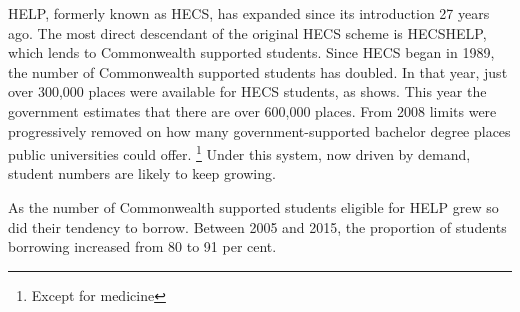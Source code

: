 \documentclass[embargoed]{grattan}
\begin{document}
\gls{HELP}, formerly known as \gls{HECS}, has expanded since its introduction 27 years ago.
The most direct descendant of the original \gls{HECS} scheme is \gls{HECSHELP}, which lends to Commonwealth supported students.
Since \gls{HECS} began in 1989, the number of Commonwealth supported students has doubled.
In that year, just over 300,000 places were available for \gls{HECS} students, as  shows.\afterpage{\cleardoublepage} %
This year the government estimates that there are over 600,000 places.
From 2008 limits were progressively removed on how many government-supported bachelor degree places public universities could offer.%
\footnote{Except for medicine} Under this system, now driven by demand, student numbers are likely to keep growing.


As the number of Commonwealth supported students eligible for \gls{HELP} grew so did their tendency to borrow.
Between 2005 and 2015, the proportion of students borrowing increased from 80 to 91 per cent.%
\end{document}
